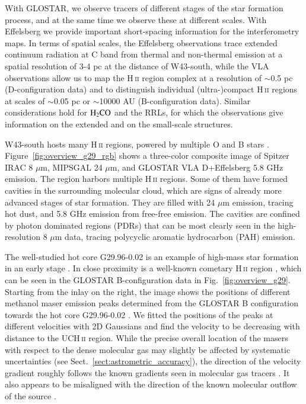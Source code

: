 \documentclass{aa}
\DeclareRobustCommand{\ion}[2]{\textup{#1\,\textsc{\lowercase{#2}}}}
\begin{document}
With GLOSTAR, we observe tracers of different stages of the star formation process, and at the same time we observe these at different scales. With Effelsberg we provide important short-spacing information for the interferometry maps. In terms of spatial scales, the Effelsberg observations trace extended continuum radiation at C band   from thermal and non-thermal emission at a spatial resolution of 3-4 pc at the distance of W43-south, while the VLA observations allow us to map the \ion{H}{ii} region complex at a resolution of $\sim$0.5 pc (D-configuration data) and to distinguish individual (ultra-)compact \ion{H}{ii} regions at scales of $\sim$0.05 pc or $\sim$10000 AU (B-configuration data). Similar considerations hold for ${\rm H_2CO}$ and the RRLs, for which the observations give information   on the extended and on the small-scale structures.

W43-south  hosts many \ion{H}{ii} regions, powered by multiple O and B stars \citep[e.g.,][]{BeltranOlmi:2013aa}. Figure~\ref{fig:overview_g29_rgb} shows a three-color composite image of Spitzer IRAC 8 $\mu$m, MIPSGAL 24 $\mu$m, and GLOSTAR VLA D+Effelsberg 5.8 GHz emission. The region harbors multiple \ion{H}{ii} regions. Some of them have formed cavities in the surrounding molecular cloud, which are signs of already more advanced stages of star formation. They are filled with 24 $\mu$m emission, tracing hot dust, and 5.8 GHz emission from free-free emission. The cavities are confined by photon dominated regions (PDRs) that can be most clearly seen in the high-resolution 8 $\mu$m data, tracing polycyclic aromatic hydrocarbon (PAH) emission.

The well-studied hot core G29.96-0.02 is an example of high-mass star formation in an early stage \citep[e.g.,][]{CesaroniChurchwell:1994aa,CesaroniHofner:1998aa,GibbWyrowski:2004aa}. In close proximity is a well-known cometary \ion{H}{ii} region \citep[e.g.,][]{WoodChurchwell:1989ab}, which can be seen in the GLOSTAR B-configuration data in Fig.~\ref{fig:overview_g29}. Starting from the inlay on the right, the image shows the positions of different methanol maser emission peaks determined from the GLOSTAR B configuration towards the hot core G29.96-0.02 \citep[e.g.,][]{WalshBurton:1998aa,MinierConway:2001aa}. We fitted the positions of the peaks at different velocities with 2D Gaussians and find the velocity to be decreasing with distance to the UC\ion{H}{ii} region. While the precise overall location of the masers with respect to the dense molecular gas may slightly be affected by systematic uncertainties (see Sect.~\ref{sect:astrometric_accuracy}), the direction of the velocity gradient roughly follows the known gradients seen in molecular gas tracers \citep[e.g.,][]{OlmiCesaroni:2003aa,BeutherZhang:2007aa,BeltranCesaroni:2011aa}. It also appears to be misaligned with the direction of the known molecular outflow of the source \citep{GibbWyrowski:2004aa}.
\end{document}
